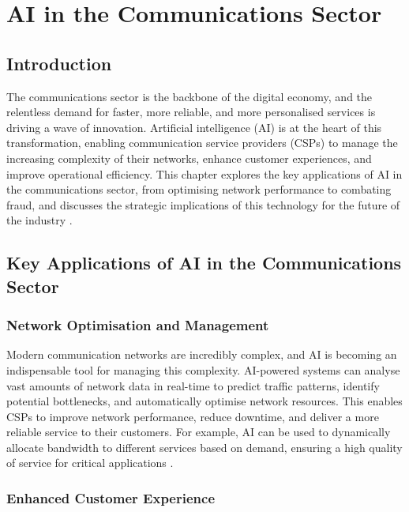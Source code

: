 \chapter{AI in the Communications Sector}
\label{cha:ai_in_the_communications_sector}

\section{Introduction}

The communications sector is the backbone of the digital economy, and the relentless demand for faster, more reliable, and more personalised services is driving a wave of innovation. Artificial intelligence (AI) is at the heart of this transformation, enabling communication service providers (CSPs) to manage the increasing complexity of their networks, enhance customer experiences, and improve operational efficiency. This chapter explores the key applications of AI in the communications sector, from optimising network performance to combating fraud, and discusses the strategic implications of this technology for the future of the industry \parencite{wef2020impact}.

\section{Key Applications of AI in the Communications Sector}

\subsection{Network Optimisation and Management}

Modern communication networks are incredibly complex, and AI is becoming an indispensable tool for managing this complexity. AI-powered systems can analyse vast amounts of network data in real-time to predict traffic patterns, identify potential bottlenecks, and automatically optimise network resources. This enables CSPs to improve network performance, reduce downtime, and deliver a more reliable service to their customers. For example, AI can be used to dynamically allocate bandwidth to different services based on demand, ensuring a high quality of service for critical applications \parencite{kumar2019role}.

\subsection{Enhanced Customer Experience}


